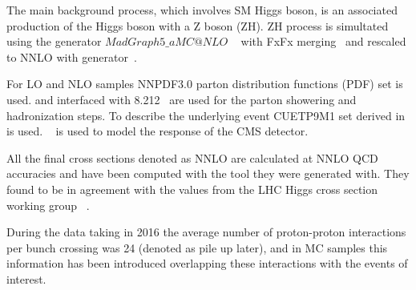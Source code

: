 The main background
       process, which involves SM Higgs boson, is an associated
       production of the Higgs boson with a Z boson (ZH).  ZH process
       is simultated using the generator
$MadGraph5\_aMC@NLO$
~\cite{cite_aMC@NLO} with FxFx
merging~\cite{Frederix:2012ps} and
rescaled to NNLO with
{\MCFM} generator~\cite{Campbell:2010ff}.


For LO and NLO samples NNPDF3.0 parton distribution functions (PDF)
set is used. {\POWHEG} and {\MADGRAPH} interfaced with
{\PYTHIA}8.212~\cite{Sjostrand:2007gs} are used for the parton
showering and hadronization steps. To describe the underlying event
CUETP9M1 set derived in \cite{Khachatryan:2015pea} is
used. \GEANTfour~\cite{GEANT4} is used to model the response of the
CMS detector.

All the final cross sections denoted as NNLO are calculated at NNLO QCD accuracies and have been computed with the tool they were generated with. They found to be in agreement with the values from the LHC Higgs cross section working group ~\cite{LHCHXSWG, xsecZH, xsecTT, xsecST, xsecVV}.

During the data taking in 2016 the average number of proton-proton interactions per bunch crossing was 24 (denoted as pile up later), and in MC samples this information has been introduced overlapping these interactions with the events of interest.



